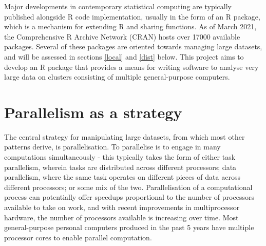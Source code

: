 \documentclass[a4paper,10pt]{article}
\begin{document}
Major developments in contemporary statistical computing are typically published alongside R code implementation, usually in the form of an R package, which is a mechanism for extending R and sharing functions.
As of March 2021, the Comprehensive R Archive Network (CRAN) hosts over 17000 available packages\cite{team20:_r}.
Several of these packages are oriented towards managing large datasets, and will be assessed in sections \ref{local} and \ref{dist}  below.
This project aims to develop an R package that provides a means for writing software to analyse very large data on clusters consisting of multiple general-purpose computers.

\section{Parallelism as a strategy}
\label{parallel}
The central strategy for manipulating large datasets, from which most other patterns derive, is parallelisation. To parallelise is to engage in many computations simultaneously - this typically takes the form of either task parallelism, wherein tasks are distributed across different processors; data parallelism, where the same task operates on different pieces of data across different processors; or some mix of the two.
Parallelisation of a computational process can potentially offer speedups proportional to the number of processors available to take on work, and with recent improvements in multiprocessor hardware, the number of processors available is increasing over time.
Most general-purpose personal computers produced in the past 5 years have multiple processor cores to enable parallel computation.
\end{document}
